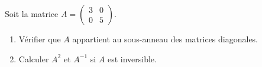 \begin{exercice}
Soit la matrice \( A = \begin{pmatrix} 3 & 0 \\ 0 & 5 \end{pmatrix} \).
\begin{enumerate}
    \item Vérifier que \( A \) appartient au sous-anneau des matrices diagonales.
    \item Calculer \( A^2 \) et \( A^{-1} \) si \( A \) est inversible.
\end{enumerate}
\end{exercice}

